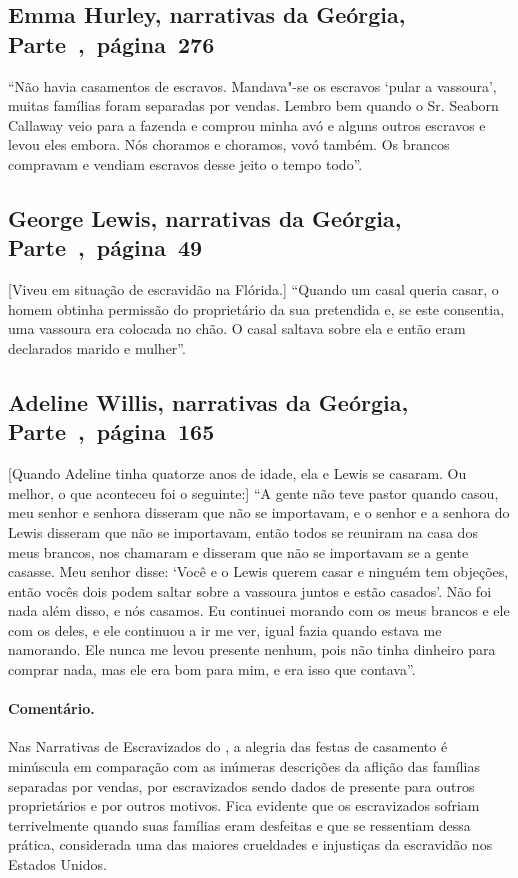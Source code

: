 \subsection{Emma Hurley, narrativas da Geórgia, Parte~,~página~276}
\label{ref158}

``Não havia casamentos de escravos. Mandava"-se os escravos `pular a
vassoura', muitas famílias foram separadas por vendas. Lembro bem
quando o Sr. Seaborn Callaway veio para a fazenda e comprou minha avó e
alguns outros escravos e levou eles embora. Nós choramos e choramos,
vovó também. Os brancos compravam e vendiam escravos desse jeito o tempo
todo''.

\subsection{George Lewis, narrativas da Geórgia, Parte~,~página~49}
\label{ref172}

{[}Viveu em situação de escravidão na Flórida.{]} ``Quando um casal queria casar, o homem obtinha permissão do
proprietário da sua pretendida e, se este consentia, uma vassoura era
colocada no chão. O casal saltava sobre ela e então eram declarados
marido e mulher''.

\subsection{Adeline Willis, narrativas da Geórgia, Parte~,~página~165}
\label{ref298}

{[}Quando Adeline tinha quatorze anos de idade, ela e Lewis se casaram. Ou melhor, o que aconteceu foi o seguinte:{]} ``A gente não teve pastor quando
casou, meu senhor e senhora disseram que não se importavam, e o senhor e
a senhora do Lewis disseram que não se importavam, então todos se
reuniram na casa dos meus brancos, nos chamaram e disseram que não se
importavam se a gente casasse. Meu senhor disse: `Você e o Lewis querem
casar e ninguém tem objeções, então vocês dois podem saltar sobre a
vassoura juntos e estão casados'. Não foi nada além disso, e nós
casamos. Eu continuei morando com os meus brancos e ele com os deles, e
ele continuou a ir me ver, igual fazia quando estava me namorando. Ele
nunca me levou presente nenhum, pois não tinha dinheiro para comprar
nada, mas ele era bom para mim, e era isso que contava''.

\paragraph{Comentário.}\quad
{\small
Nas Narrativas de Escravizados do , a alegria das festas de
casamento é minúscula em comparação com as inúmeras descrições da
aflição das famílias separadas por vendas, por escravizados sendo dados de
presente para outros proprietários e por outros motivos. Fica evidente
que os escravizados sofriam terrivelmente quando suas famílias eram
desfeitas e que se ressentiam dessa prática, considerada uma das maiores
crueldades e injustiças da escravidão nos Estados Unidos.
}

